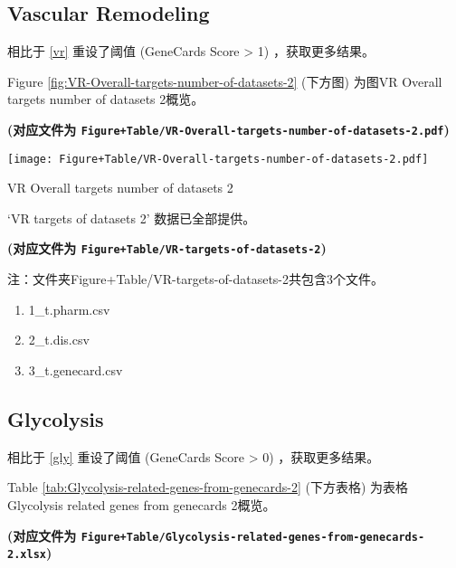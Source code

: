 \documentclass[
]{article}
\providecommand{\tightlist}{%
  \setlength{\itemsep}{0pt}\setlength{\parskip}{0pt}}
\begin{document}
\hypertarget{vascular-remodeling}{%
\subsection{Vascular Remodeling}\label{vascular-remodeling}}

相比于 \ref{vr} 重设了阈值 (GeneCards Score \textgreater{} 1) ，获取更多结果。

Figure \ref{fig:VR-Overall-targets-number-of-datasets-2} (下方图) 为图VR Overall targets number of datasets 2概览。

\textbf{(对应文件为 \texttt{Figure+Table/VR-Overall-targets-number-of-datasets-2.pdf})}

\def\@captype{figure}
\begin{center}
\texttt{[image: Figure+Table/VR-Overall-targets-number-of-datasets-2.pdf]}
\caption{VR Overall targets number of datasets 2}\label{fig:VR-Overall-targets-number-of-datasets-2}
\end{center}

`VR targets of datasets 2' 数据已全部提供。

\textbf{(对应文件为 \texttt{Figure+Table/VR-targets-of-datasets-2})}

\begin{center}\begin{tcolorbox}[colback=gray!10, colframe=gray!50, width=0.9\linewidth, arc=1mm, boxrule=0.5pt]注：文件夹Figure+Table/VR-targets-of-datasets-2共包含3个文件。

\begin{enumerate}\tightlist
\item 1\_t.pharm.csv
\item 2\_t.dis.csv
\item 3\_t.genecard.csv
\end{enumerate}\end{tcolorbox}
\end{center}

\hypertarget{glycolysis}{%
\subsection{Glycolysis}\label{glycolysis}}

相比于 \ref{gly} 重设了阈值 (GeneCards Score \textgreater{} 0) ，获取更多结果。

Table \ref{tab:Glycolysis-related-genes-from-genecards-2} (下方表格) 为表格Glycolysis related genes from genecards 2概览。

\textbf{(对应文件为 \texttt{Figure+Table/Glycolysis-related-genes-from-genecards-2.xlsx})}
\end{document}
